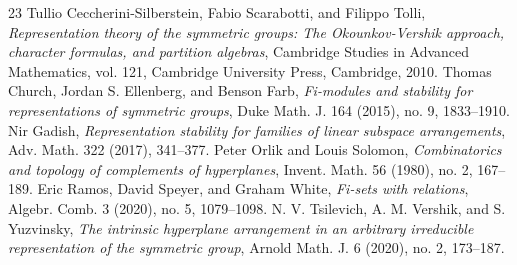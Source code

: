 \begin{thebibliography}{23}
 Tullio Ceccherini-Silberstein, Fabio Scarabotti, and Filippo Tolli, \emph{Representation theory of the symmetric groups: The Okounkov-Vershik approach, character formulas, and partition algebras}, Cambridge Studies in Advanced Mathematics, vol. 121, Cambridge University Press, Cambridge, 2010.
 Thomas Church, Jordan S. Ellenberg, and Benson Farb, \emph{Fi-modules and stability for representations of symmetric groups}, Duke Math. J. 164 (2015), no. 9, 1833--1910.
 Nir Gadish, \emph{Representation stability for families of linear subspace arrangements}, Adv. Math. 322 (2017), 341--377.
 Peter Orlik and Louis Solomon, \emph{Combinatorics and topology of complements of hyperplanes}, Invent. Math. 56 (1980), no. 2, 167--189.
 Eric Ramos, David Speyer, and Graham White, \emph{Fi-sets with relations}, Algebr. Comb. 3 (2020), no. 5, 1079--1098.
 N. V. Tsilevich, A. M. Vershik, and S. Yuzvinsky, \emph{The intrinsic hyperplane arrangement in an arbitrary irreducible representation of the symmetric group}, Arnold Math. J. 6 (2020), no. 2, 173--187.
\end{thebibliography}
